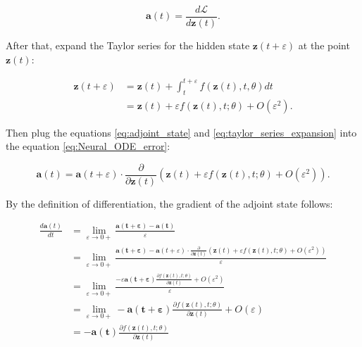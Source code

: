 \documentclass[
	parskip, 			   %
	twoside, 			   %
	DIV=14, 			   %
	BCOR=15.0mm, 		   %
	headsepline, 		   %
	open=right, 		   %
	captions=tableheading, %
	bibliography=totoc,    %
	numbers=noenddot       %
]{scrreprt}
\begin{document}
\begin{equation}
    \label{eq:adjoint_state}
    \mathbf{a}(t) = \frac{d\mathcal{L}}{d\mathbf{z}(t)}.
\end{equation}

After that, expand the Taylor series for the hidden state $\mathbf{z}(t+\varepsilon )$ at the point $\mathbf{z}(t)$:

\begin{equation}
    \label{eq:taylor_series_expansion}
    \begin{aligned}
    \mathbf{z}(t+\varepsilon ) &= \mathbf{z}(t) + \int_{t}^{t+\varepsilon } f(\mathbf{z}(t), t, \theta)dt\\
    &= \mathbf{z}(t) + \varepsilon f(\mathbf{z}(t), t; \theta) + O (\varepsilon ^2).
    \end{aligned}
\end{equation}

Then plug the equations \ref{eq:adjoint_state} and \ref{eq:taylor_series_expansion} into the equation \ref{eq:Neural_ODE_error}:

\begin{equation}
    \label{eq:Neural_ODE_adjoint_state}
    \mathbf{a}(t) = \mathbf{a}(t+\varepsilon ) \cdot \frac{\partial}{\partial \mathbf{z}(t)} (\mathbf{z}(t) + \varepsilon f(\mathbf{z}(t), t; \theta) + O (\varepsilon ^2)) .
\end{equation}

By the definition of differentiation, the gradient of the adjoint state follows:

\begin{equation}
    \label{eq:adjoint_state_gradient_hidden_state}
    \begin{aligned}
        \frac{d\mathbf{a}(t)}{dt} &= \lim_{\varepsilon \to 0+} \frac{\mathbf{a(t+\varepsilon)}-\mathbf{a(t)}}{\varepsilon} \\
        &= \lim_{\varepsilon \to 0+} \frac{\mathbf{a(t+\varepsilon)}-\mathbf{a}(t+\varepsilon ) \cdot \frac{\partial}{\partial \mathbf{z}(t)} (\mathbf{z}(t) + \varepsilon f(\mathbf{z}(t), t; \theta) + O (\varepsilon ^2)) }{\varepsilon}\\
        &= \lim_{\varepsilon \to 0+} \frac{-\varepsilon \mathbf{a(t+\varepsilon)} \frac{\partial f(\mathbf{z}(t), t; \theta)}{\partial \mathbf{z}(t)} + O (\varepsilon ^2)}{\varepsilon}\\
        &= \lim_{\varepsilon \to 0+} - \mathbf{a(t+\varepsilon)} \frac{\partial f(\mathbf{z}(t), t; \theta)}{\partial \mathbf{z}(t)} + O (\varepsilon)\\
        &= - \mathbf{a(t)} \frac{\partial f(\mathbf{z}(t), t; \theta)}{\partial \mathbf{z}(t)}
    \end{aligned}
\end{equation}
\end{document}
